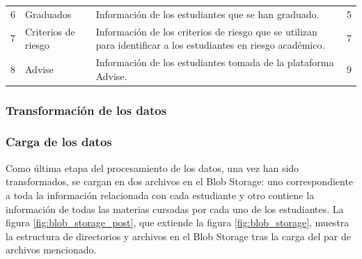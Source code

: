 \begin{table}[h]
\begin{tabular}{cp{2.3cm}p{7cm}c}
		6              & Graduados                                          & Información de los estudiantes que se han graduado.                                                                                  & 5                        \\
		7              & Criterios \newline de riesgo                       & Información de los criterios de riesgo que se utilizan para identificar a los estudiantes en riesgo académico.                       & 7                        \\
		8              & Advise                                             & Información de los estudiantes tomada de la plataforma Advise.                                                                       & 9                        \\
		\hline
	\end{tabular}
	\label{tab:extraccion}
\end{table}

\subsubsection{Transformación de los datos}


\subsubsection{Carga de los datos}

Como última etapa del procesamiento de los datos, una vez han sido transformados, se cargan en dos archivos en el Blob Storage: uno correspondiente a toda la información relacionada con cada estudiante y otro contiene la información de todas las materias cursadas por cada uno de los estudiantes. La figura \ref{fig:blob_storage_post}, que extiende la figura \ref{fig:blob_storage}, muestra la estructura de directorios y archivos en el Blob Storage tras la carga del par de archivos mencionado.

